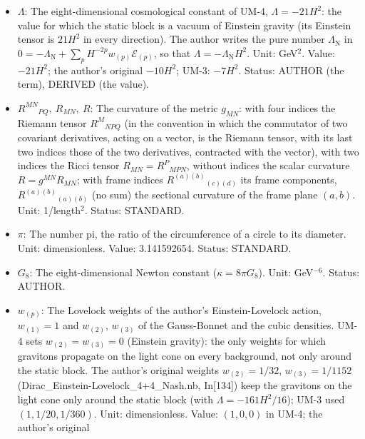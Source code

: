 \documentclass[
  10pt,
]{article}
\begin{document}
\begin{itemize}
  a scalar built from \(p\) curvature tensors: \(\mathcal{L}_{(1)} = R\)
  (Einstein-Hilbert), \(\mathcal{L}_{(2)}\) the Gauss-Bonnet density,
  \(\mathcal{L}_{(3)}\) the cubic Lovelock density. Unit:
  1/length\(^{2p}\). Status: STANDARD.
\item
  \(\Lambda\): The eight-dimensional cosmological constant of UM-4,
  \(\Lambda = -21H^2\): the value for which the static block is a vacuum
  of Einstein gravity (its Einstein tensor is \(21H^2\) in every
  direction). The author writes the pure number \(\Lambda_{\mathrm{N}}\)
  in
  \(0 = -\Lambda_{\mathrm{N}} + \sum_p H^{-2p}w_{(p)}\mathcal{E}_{(p)}\),
  so that \(\Lambda = -\Lambda_{\mathrm{N}}H^2\). Unit: GeV\(^2\).
  Value: \(-21H^2\); the author's original \(-10H^2\); UM-3: \(-7H^2\).
  Status: AUTHOR (the term), DERIVED (the value).
\item
  \(R^{MN}{}_{PQ},\ R_{MN},\ R\): The curvature of the metric
  \(g_{MN}\): with four indices the Riemann tensor \(R^M{}_{NPQ}\) (in
  the convention in which the commutator of two covariant derivatives,
  acting on a vector, is the Riemann tensor, with its last two indices
  those of the two derivatives, contracted with the vector), with two
  indices the Ricci tensor \(R_{MN} = R^P{}_{MPN}\), without indices the
  scalar curvature \(R = g^{MN}R_{MN}\); with frame indices
  \(R^{(a)(b)}{}_{(c)(d)}\) its frame components,
  \(R^{(a)(b)}{}_{(a)(b)}\) (no sum) the sectional curvature of the
  frame plane \((a, b)\). Unit: 1/length\(^2\). Status: STANDARD.
\item
  \(\pi\): The number pi, the ratio of the circumference of a circle to
  its diameter. Unit: dimensionless. Value: 3.141592654. Status:
  STANDARD.
\item
  \(G_8\): The eight-dimensional Newton constant
  (\(\kappa = 8\pi G_8\)). Unit: GeV\(^{-6}\). Status: AUTHOR.
\item
  \(w_{(p)}\): The Lovelock weights of the author's Einstein-Lovelock
  action, \(w_{(1)} = 1\) and \(w_{(2)}\), \(w_{(3)}\) of the
  Gauss-Bonnet and the cubic densities. UM-4 sets
  \(w_{(2)} = w_{(3)} = 0\) (Einstein gravity): the only weights for
  which gravitons propagate on the light cone on every background, not
  only around the static block. The author's original weights
  \(w_{(2)} = 1/32\), \(w_{(3)} = 1/1152\)
  (Dirac\_Einstein-Lovelock\_4+4\_Nash.nb, In{[}134{]}) keep the
  gravitons on the light cone only around the static block (with
  \(\Lambda = -161H^2/16\)); UM-3 used \((1, 1/20, 1/360)\). Unit:
  dimensionless. Value: \((1, 0, 0)\) in UM-4; the author's original

\end{itemize}
\end{document}
